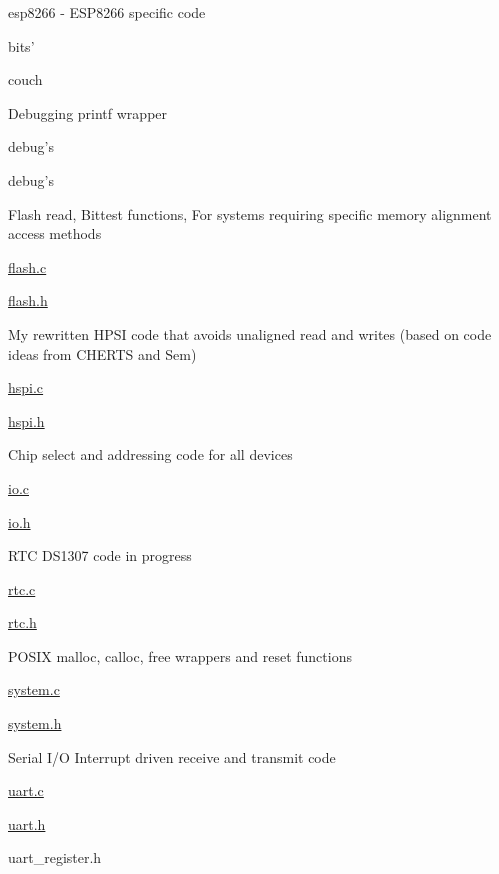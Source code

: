 esp8266 -\/ E\+S\+P8266 specific code
\begin{DoxyItemize}
\item bits’
\item couch
\item Debugging printf wrapper
\begin{DoxyItemize}
\item debug’s
\item debug’s
\end{DoxyItemize}
\item Flash read, Bittest functions, For systems requiring specific memory alignment access methods
\begin{DoxyItemize}
\item \hyperlink{flash_8c}{flash.\+c}
\item \hyperlink{flash_8h}{flash.\+h}
\end{DoxyItemize}
\item My rewritten H\+P\+SI code that avoids unaligned read and writes (based on code ideas from C\+H\+E\+R\+TS and Sem)
\begin{DoxyItemize}
\item \hyperlink{hspi_8c}{hspi.\+c}
\item \hyperlink{hspi_8h}{hspi.\+h}
\end{DoxyItemize}
\item Chip select and addressing code for all devices
\begin{DoxyItemize}
\item \hyperlink{io_8c}{io.\+c}
\item \hyperlink{io_8h}{io.\+h}
\end{DoxyItemize}
\item R\+TC D\+S1307 code in progress
\begin{DoxyItemize}
\item \hyperlink{rtc_8c}{rtc.\+c}
\item \hyperlink{rtc_8h}{rtc.\+h}
\end{DoxyItemize}
\item P\+O\+S\+IX malloc, calloc, free wrappers and reset functions
\begin{DoxyItemize}
\item \hyperlink{system_8c}{system.\+c}
\item \hyperlink{system_8h}{system.\+h}
\end{DoxyItemize}
\item Serial I/O Interrupt driven receive and transmit code
\begin{DoxyItemize}
\item \hyperlink{uart_8c}{uart.\+c}
\item \hyperlink{uart_8h}{uart.\+h}
\item uart\+\_\+register.\+h
\end{DoxyItemize}
\end{DoxyItemize}

